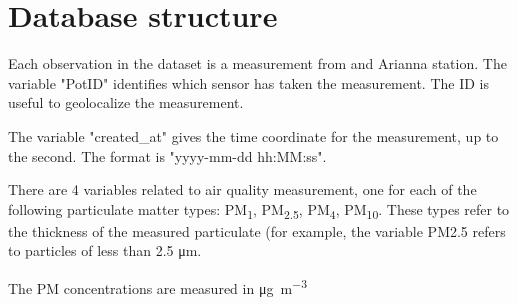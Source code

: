 \documentclass{article}
\begin{document}
\section{Database structure}

Each observation in the dataset is a measurement from and Arianna station. 
The variable "PotID" identifies which sensor has taken the measurement. The ID is useful to geolocalize the measurement.

The variable "created\_at" gives the time coordinate for the measurement, up to the second. The format is "yyyy-mm-dd hh:MM:ss".

There are 4 variables related to air quality measurement, one for each of the following particulate matter types: PM\textsubscript{1}, PM\textsubscript{2.5}, PM\textsubscript{4}, PM\textsubscript{10}. These types refer to the thickness of the measured particulate (for example, the variable PM{2.5} refers to particles of less than 2.5 \si{\micro\meter}.

The PM concentrations are measured in \si{\micro\gram\per\cubic\meter}
\end{document}
